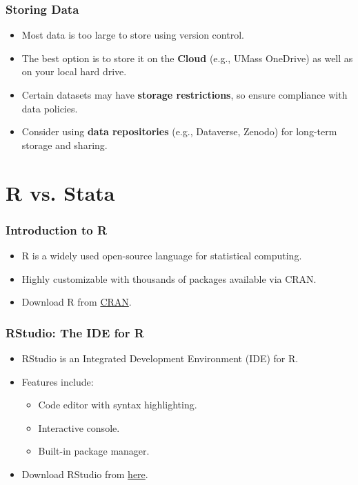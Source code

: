 \documentclass{beamer}
\begin{document}
\begin{frame}
    \frametitle{Storing Data}

    \begin{itemize}
        \item Most data is too large to store using version control.
        \item The best option is to store it on the \textbf{Cloud} (e.g., UMass OneDrive) as well as on your local hard drive.
        \item Certain datasets may have \textbf{storage restrictions}, so ensure compliance with data policies.
        \item Consider using \textbf{data repositories} (e.g., Dataverse, Zenodo) for long-term storage and sharing.
    \end{itemize}
\end{frame}


\section{R vs. Stata}
\label{sec:rvstata}

\begin{frame}
    \frametitle{Introduction to R}
\begin{itemize}
    \item R is a widely used open-source language for statistical computing.
    \item Highly customizable with thousands of packages available via CRAN.
    \item Download R from \href{https://cloud.r-project.org}{CRAN}.
\end{itemize}
\end{frame}

\begin{frame}
    \frametitle{RStudio: The IDE for R}
\begin{itemize}
    \item RStudio is an Integrated Development Environment (IDE) for R.
    \item Features include:
    \begin{itemize}
        \item Code editor with syntax highlighting.
        \item Interactive console.
        \item Built-in package manager.
    \end{itemize}
    \item Download RStudio from \href{https://posit.co/download/rstudio-desktop/}{here}.
\end{itemize}
\end{frame}
\end{document}

